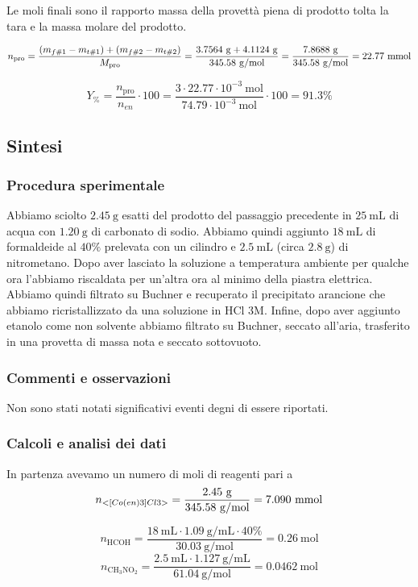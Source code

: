 Le moli finali sono il rapporto massa della provettà piena di prodotto tolta la tara e la massa molare del prodotto.

\[ n_\text{pro} = \frac{(m_{f\#1} - m_{t\#1})+(m_{f\#2} - m_{t\#2})}{M_\text{pro}} 
 = \frac{ 3.7564 \mathrm{\ g} + 4.1124 \mathrm{\ g} }{ 345.58 \mathrm{\ g/mol}} =  \frac{7.8688 \mathrm{~g}}{345.58 \mathrm{~g} / \mathrm{mol}}=22.77 \mathrm{\ mmol}\]

\[ Y_\% = \frac{n_\text{pro}}{n_{en}}\cdot 100  = \frac{3 \cdot 22.77 \cdot 10^{-3} \mathrm{~mol}}{74.79 \cdot 10^{-3} \mathrm{~mol}} \cdot 100 =91.3\%\]


\subsection{Sintesi }
\subsubsection{Procedura sperimentale}
Abbiamo sciolto $2.45 \mathrm{~g}$ esatti del prodotto del passaggio precedente in $25 \mathrm{~mL}$ di acqua con $1.20 \mathrm{~g}$ di carbonato di sodio. Abbiamo quindi aggiunto $18 \mathrm{~mL}$ di formaldeide al $40 \%$ prelevata con un cilindro e $2.5 \mathrm{~mL}$ (circa $2.8 \mathrm{~g}$) di nitrometano. Dopo aver lasciato la soluzione a temperatura ambiente per qualche ora l'abbiamo riscaldata per un'altra ora al minimo della piastra elettrica. Abbiamo quindi filtrato su Buchner e recuperato il precipitato arancione che abbiamo ricristallizzato da una soluzione in $\mathrm{HCl} $ 3M. Infine, dopo aver aggiunto etanolo come non solvente abbiamo filtrato su Buchner, seccato all'aria, trasferito in una provetta di massa nota e seccato sottovuoto.
\subsubsection{Commenti e osservazioni}
Non sono stati notati significativi eventi degni di essere riportati.


\subsubsection{Calcoli e analisi dei dati}
In partenza avevamo un numero di moli di reagenti pari a
\[ n_{<[Co(en)3]Cl3>}=\frac{2.45 \mathrm{~g}}{345.58 \mathrm{~g} / \mathrm{mol}}= 7.090 \mathrm{~mmol} \]

\[ n_{\mathrm{HCOH}}=\frac{18 \mathrm{~mL} \cdot 1.09 \mathrm{~g} / \mathrm{mL} \cdot 40 \%}{30.03 \mathrm{~g} / \mathrm{mol}}=0.26 \mathrm{~mol} \]
\[ n_{\mathrm{CH}_3 \mathrm{NO}_2}=\frac{2.5 \mathrm{~mL} \cdot 1.127 \mathrm{~g} / \mathrm{mL}}{61.04 \mathrm{~g} / \mathrm{mol}}=0.0462 \mathrm{~mol} \]

